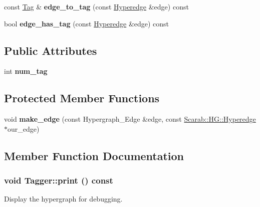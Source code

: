 \begin{DoxyCompactItemize}
\item 
\hypertarget{classTagger_ad615c8356f380baab01ae6675a25c409}{
const \hyperlink{structTag}{Tag} \& {\bfseries edge\_\-to\_\-tag} (const \hyperlink{classScarab_1_1HG_1_1Hyperedge}{Hyperedge} \&edge) const }
\label{classTagger_ad615c8356f380baab01ae6675a25c409}

\item 
\hypertarget{classTagger_ad7f1dda6082e71cd113a3d77e9c33275}{
bool {\bfseries edge\_\-has\_\-tag} (const \hyperlink{classScarab_1_1HG_1_1Hyperedge}{Hyperedge} \&edge) const }
\label{classTagger_ad7f1dda6082e71cd113a3d77e9c33275}

\end{DoxyCompactItemize}
\subsection*{Public Attributes}
\begin{DoxyCompactItemize}
\item 
\hypertarget{classTagger_a4bf3332c608c078cbb2d5692c4f13b43}{
int {\bfseries num\_\-tag}}
\label{classTagger_a4bf3332c608c078cbb2d5692c4f13b43}

\end{DoxyCompactItemize}
\subsection*{Protected Member Functions}
\begin{DoxyCompactItemize}
\item 
\hypertarget{classTagger_a305fd4cf75f2149a57109772e195eb47}{
void {\bfseries make\_\-edge} (const Hypergraph\_\-Edge \&edge, const \hyperlink{classScarab_1_1HG_1_1Hyperedge}{Scarab::HG::Hyperedge} $\ast$our\_\-edge)}
\label{classTagger_a305fd4cf75f2149a57109772e195eb47}

\end{DoxyCompactItemize}


\subsection{Member Function Documentation}
\hypertarget{classTagger_a4ebe0aebd7c0392970b401a5a6c6cd72}{
\subsubsection[{print}]{\setlength{\rightskip}{0pt plus 5cm}void Tagger::print () const}}
\label{classTagger_a4ebe0aebd7c0392970b401a5a6c6cd72}
Display the hypergraph for debugging. 

